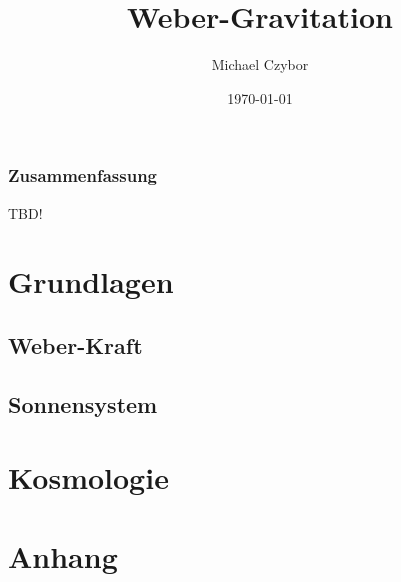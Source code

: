 \documentclass{book}
\numberwithin{equation}{section}
\begin{document}
\title{Weber-Gravitation}
\author{Michael Czybor}
\date{\today}
\maketitle

\section*{Zusammenfassung}
TBD!

\tableofcontents

\part{Grundlagen}
\chapter{Weber-Kraft}





\chapter{Sonnensystem}


\part{Kosmologie}

\part{Anhang}


\end{document}
